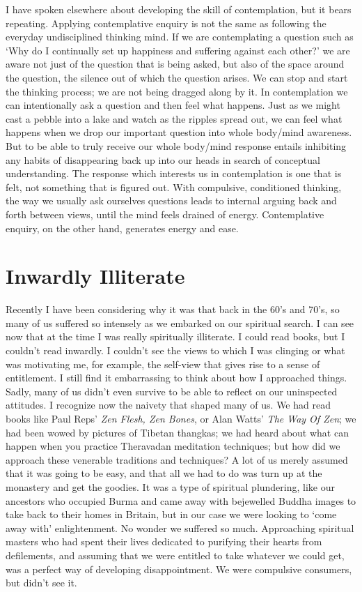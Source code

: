 I have spoken elsewhere about developing the skill of contemplation, but
it bears repeating. Applying contemplative enquiry is not the same as
following the everyday undisciplined thinking mind. If we are
contemplating a question such as ‘Why do I continually set up happiness
and suffering against each other?’ we are aware not just of the question
that is being asked, but also of the space around the question, the
silence out of which the question arises. We can stop and start the
thinking process; we are not being dragged along by it. In contemplation
we can intentionally ask a question and then feel what happens. Just as
we might cast a pebble into a lake and watch as the ripples spread out,
we can feel what happens when we drop our important question into whole
body/mind awareness. But to be able to truly receive our whole body/mind
response entails inhibiting any habits of disappearing back up into our
heads in search of conceptual understanding. The response which
interests us in contemplation is one that is felt, not something that is
figured out. With compulsive, conditioned thinking, the way we usually
ask ourselves questions leads to internal arguing back and forth between
views, until the mind feels drained of energy. Contemplative enquiry, on
the other hand, generates energy and ease.

\section{Inwardly Illiterate}

Recently I have been considering why it was that back in the 60’s and
70’s, so many of us suffered so intensely as we embarked on our
spiritual search. I can see now that at the time I was really
spiritually illiterate. I could read books, but I couldn’t read
inwardly. I couldn’t see the views to which I was clinging or what was
motivating me, for example, the self-view that gives rise to a sense of
entitlement. I still find it embarrassing to think about how I
approached things. Sadly, many of us didn’t even survive to be able to
reflect on our uninspected attitudes. I recognize now the naivety that
shaped many of us. We had read books like Paul Reps' \emph{Zen Flesh, Zen
Bones}, or Alan Watts' \emph{The Way Of Zen}; we had been wowed by pictures
of Tibetan thangkas; we had heard about what can happen when you practice
Theravadan meditation techniques; but how did we approach these
venerable traditions and techniques? A lot of us merely assumed that it
was going to be easy, and that all we had to do was turn up at the
monastery and get the goodies. It was a type of spiritual plundering,
like our ancestors who occupied Burma and came away with bejewelled
Buddha images to take back to their homes in Britain, but in our case we
were looking to ‘come away with’ enlightenment. No wonder we suffered so
much. Approaching spiritual masters who had spent their lives dedicated
to purifying their hearts from defilements, and assuming that we were
entitled to take whatever we could get, was a perfect way of developing
disappointment. We were compulsive consumers, but didn’t see it.

